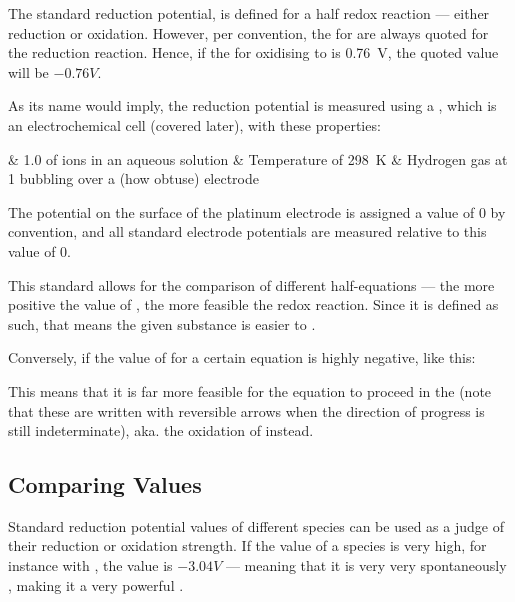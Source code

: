 		The standard reduction potential, \Eo{} is defined for a half redox reaction --- either reduction or oxidation. However, per
		convention, the  for \Eo{} are always quoted for the reduction reaction. Hence, if the \Eo{} for oxidising
		 to  is \SI{+0.76}{\volt}, the quoted \Eo{} value will be $-0.76V$.

		As its name would imply, the  reduction potential is measured using a , which is
		an electrochemical cell (covered later), with these properties:

		\begin{bulletlist}
			& \SI{1.0}{\molarConc} of  ions in an aqueous solution
			& Temperature of \SI{298}{\kelvin}
			& Hydrogen gas at \SI{1}{\atm} bubbling over a  (how obtuse) electrode
		\end{bulletlist}

		The potential on the surface of the platinum electrode is assigned a value of $0$ by convention, and all standard electrode
		potentials are measured relative to this value of $0$.

		This standard allows for the comparison of different half-equations --- the more positive the value of \Eo{}, the more
		feasible the redox reaction. Since it is defined as such, that means the given substance is easier to .

		Conversely, if the value of \Eo{} for a certain equation is highly negative, like this:


		This means that it is far more feasible for the equation to proceed in the  (note that these are
		written with reversible arrows when the direction of progress is still indeterminate), aka. the oxidation of  instead.


		\subsection{Comparing \texorpdfstring{\MEo{}}{Eo} Values}

			Standard reduction potential values of different species can be used as a judge of their reduction or oxidation strength.
			If the \Eo{} value of a species is very high, for instance with , the \Eo{} value is $-3.04V$ --- meaning that it
			is very very spontaneously , making it a very powerful .

